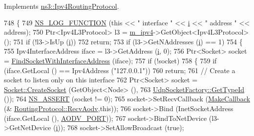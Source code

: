 Implements \hyperlink{classns3_1_1Ipv4RoutingProtocol_aef12fcf9cc478536876b0281505d40aa}{ns3\+::\+Ipv4\+Routing\+Protocol}.


\begin{DoxyCode}
748 \{
749   \hyperlink{log-macros-disabled_8h_a90b90d5bad1f39cb1b64923ea94c0761}{NS\_LOG\_FUNCTION} (\textcolor{keyword}{this} << \textcolor{stringliteral}{" interface "} << \hyperlink{bernuolliDistribution_8m_a6f6ccfcf58b31cb6412107d9d5281426}{i} << \textcolor{stringliteral}{" address "} << address);
750   Ptr<Ipv4L3Protocol> l3 = \hyperlink{classns3_1_1aodv_1_1RoutingProtocol_aee33006b1f9d8b24d4722037ff3fec98}{m\_ipv4}->GetObject<Ipv4L3Protocol> ();
751   \textcolor{keywordflow}{if} (!l3->IsUp (\hyperlink{bernuolliDistribution_8m_a6f6ccfcf58b31cb6412107d9d5281426}{i}))
752     \textcolor{keywordflow}{return};
753   \textcolor{keywordflow}{if} (l3->GetNAddresses (\hyperlink{bernuolliDistribution_8m_a6f6ccfcf58b31cb6412107d9d5281426}{i}) == 1)
754     \{
755       Ipv4InterfaceAddress iface = l3->GetAddress (\hyperlink{bernuolliDistribution_8m_a6f6ccfcf58b31cb6412107d9d5281426}{i}, 0);
756       Ptr<Socket> socket = \hyperlink{classns3_1_1aodv_1_1RoutingProtocol_a7cebc7baa398569f432ea2521310dffe}{FindSocketWithInterfaceAddress} (iface);
757       \textcolor{keywordflow}{if} (!socket)
758         \{
759           \textcolor{keywordflow}{if} (iface.GetLocal () == Ipv4Address (\textcolor{stringliteral}{"127.0.0.1"}))
760             \textcolor{keywordflow}{return};
761           \textcolor{comment}{// Create a socket to listen only on this interface}
762           Ptr<Socket> socket = \hyperlink{classns3_1_1Socket_ad448a62bb50ad3dbac59c879a885a8d2}{Socket::CreateSocket} (GetObject<Node> (),
763                                                      \hyperlink{classns3_1_1UdpSocketFactory_ad5b47e944de8861e3dc2b6de1ccbdf5b}{UdpSocketFactory::GetTypeId}
       ());
764           \hyperlink{assert_8h_a6dccdb0de9b252f60088ce281c49d052}{NS\_ASSERT} (socket != 0);
765           socket->SetRecvCallback (\hyperlink{group__makecallbackmemptr_ga9376283685aa99d204048d6a4b7610a4}{MakeCallback} (&
      \hyperlink{classns3_1_1aodv_1_1RoutingProtocol_a08c44000f66533e69bde85d68d75c354}{RoutingProtocol::RecvAodv},\textcolor{keyword}{this}));
766           socket->Bind (InetSocketAddress (iface.GetLocal (), \hyperlink{classns3_1_1aodv_1_1RoutingProtocol_ac4a3de99b49ad5f6efc9b71a700f7ec4}{AODV\_PORT}));
767           socket->BindToNetDevice (l3->GetNetDevice (\hyperlink{bernuolliDistribution_8m_a6f6ccfcf58b31cb6412107d9d5281426}{i}));
768           socket->SetAllowBroadcast (\textcolor{keyword}{true});

\end{DoxyCode}
